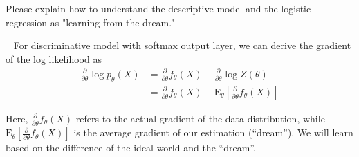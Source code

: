 \begin{exercise}[]{Please explain how to understand the descriptive model and the logistic regression as "learning from the dream."}
  \begin{solution}
  \par{~}
  For discriminative model with softmax output layer, we can derive the gradient of the log likelihood as
\begin{equation}
\begin{aligned}
\frac{\partial}{\partial \theta} \log p_{\theta}(X) &=\frac{\partial}{\partial \theta} f_{\theta}(X)-\frac{\partial}{\partial \theta} \log Z(\theta) \\
&=\frac{\partial}{\partial \theta} f_{\theta}(X)-\mathrm{E}_{\theta}\left[\frac{\partial}{\partial \theta} f_{\theta}(X)\right]
\end{aligned}
\end{equation}

Here, $\frac{\partial}{\partial \theta} f_{\theta}(X)$ refers to the actual gradient of the data distribution, while $\mathrm{E}_{\theta}\left[\frac{\partial}{\partial \theta} f_{\theta}(X)\right]$ is the average gradient of our estimation (``dream''). We will learn based on the difference of the ideal world and the ``dream''.

  \end{solution}
  \label{ex3}
\end{exercise}


